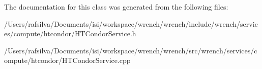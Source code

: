 The documentation for this class was generated from the following files\+:\begin{DoxyCompactItemize}
\item 
/\+Users/rafsilva/\+Documents/isi/workspace/wrench/wrench/include/wrench/services/compute/htcondor/H\+T\+Condor\+Service.\+h\item 
/\+Users/rafsilva/\+Documents/isi/workspace/wrench/wrench/src/wrench/services/compute/htcondor/H\+T\+Condor\+Service.\+cpp\end{DoxyCompactItemize}
